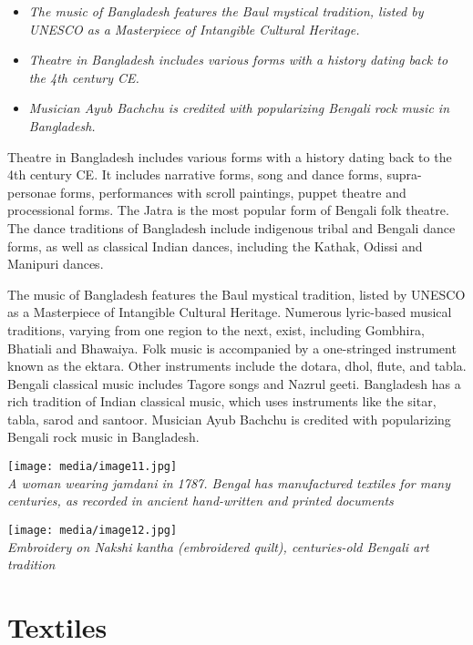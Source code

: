 \begin{itemize}
\item
  \emph{The music of Bangladesh features the Baul mystical tradition,
  listed by UNESCO as a Masterpiece of Intangible Cultural Heritage.}
\item
  \emph{Theatre in Bangladesh includes various forms with a history
  dating back to the 4th century CE.}
\item
  \emph{Musician Ayub Bachchu is credited with popularizing Bengali rock
  music in Bangladesh.}
\end{itemize}

Theatre in Bangladesh includes various forms with a history dating back
to the 4th century CE. It includes narrative forms, song and dance
forms, supra-personae forms, performances with scroll paintings, puppet
theatre and processional forms. The Jatra is the most popular form of
Bengali folk theatre.\\
The dance traditions of Bangladesh include indigenous tribal and Bengali
dance forms, as well as classical Indian dances, including the Kathak,
Odissi and Manipuri dances.

The music of Bangladesh features the Baul mystical tradition, listed by
UNESCO as a Masterpiece of Intangible Cultural Heritage. Numerous
lyric-based musical traditions, varying from one region to the next,
exist, including Gombhira, Bhatiali and Bhawaiya. Folk music is
accompanied by a one-stringed instrument known as the ektara. Other
instruments include the dotara, dhol, flute, and tabla. Bengali
classical music includes Tagore songs and Nazrul geeti. Bangladesh has a
rich tradition of Indian classical music, which uses instruments like
the sitar, tabla, sarod and santoor. Musician Ayub Bachchu is credited
with popularizing Bengali rock music in Bangladesh.

\texttt{[image: media/image11.jpg]}\\
\emph{A woman wearing jamdani in 1787. Bengal has manufactured textiles
for many centuries, as recorded in ancient hand-written and printed
documents}

\texttt{[image: media/image12.jpg]}\\
\emph{Embroidery on Nakshi kantha (embroidered quilt), centuries-old
Bengali art tradition}

\section{Textiles}\label{textiles}

